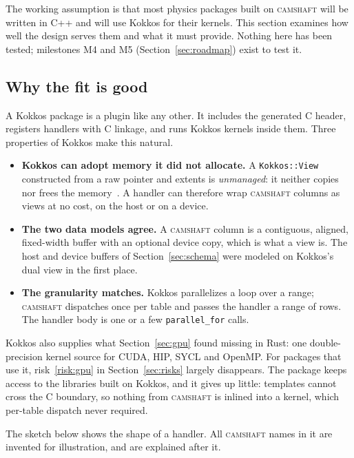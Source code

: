 \documentclass[11pt,a4paper]{article}
\newcommand{\camshaft}{\textsc{camshaft}}
\newcommand{\code}[1]{\texttt{#1}}
\begin{document}
The working assumption is that most physics packages built on \camshaft{} will be
written in C++ and will use Kokkos for their kernels.  This section examines
how well the design serves them and what it must provide.  Nothing here has
been tested; milestones M4 and M5 (Section~\ref{sec:roadmap}) exist to test
it.

\subsection{Why the fit is good}

A Kokkos package is a plugin like any other.  It includes the generated C
header, registers handlers with C linkage, and runs Kokkos kernels inside
them.  Three properties of Kokkos make this natural.

\begin{itemize}
  \item \textbf{Kokkos can adopt memory it did not allocate.}  A
        \code{Kokkos::View} constructed from a raw pointer and extents is
        \emph{unmanaged}: it neither copies nor frees the
        memory~\cite{kokkosdocs}.  A handler
        can therefore wrap \camshaft{} columns as views at no cost, on the host or
        on a device.
  \item \textbf{The two data models agree.}  A \camshaft{} column is a contiguous,
        aligned, fixed-width buffer with an optional device copy, which is
        what a view is.  The host and device buffers of
        Section~\ref{sec:schema} were modeled on Kokkos's dual view in the
        first place.
  \item \textbf{The granularity matches.}  Kokkos parallelizes a loop over a
        range; \camshaft{} dispatches once per table and passes the handler a
        range of rows.  The handler body is one or a few
        \code{parallel\_for} calls.
\end{itemize}

Kokkos also supplies what Section~\ref{sec:gpu} found missing in Rust: one
double-precision kernel source for CUDA, HIP, SYCL and OpenMP.  For packages
that use it, risk~\ref{risk:gpu} in Section~\ref{sec:risks} largely disappears.
The package keeps access to the libraries built on Kokkos, and it gives up
little: templates cannot cross the C boundary, so nothing from \camshaft{} is
inlined into a kernel, which per-table dispatch never required.

The sketch below shows the shape of a handler.  All \camshaft{} names in it
are invented for illustration, and are explained after it.
\end{document}

